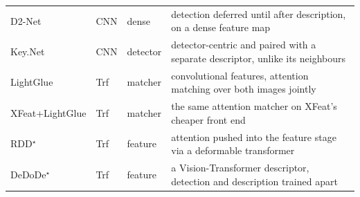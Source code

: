 \begin{table}[H]
\begin{tabular}{@{}llp{1.9cm}p{6.5cm}@{}}
D2-Net \cite{dusmanu2019d2net} & CNN & dense & detection deferred until after description, on a dense feature map \\
Key.Net \cite{barrosolaguna2019keynet} & CNN & detector & detector-centric and paired with a separate descriptor, unlike its neighbours \\
\addlinespace[2pt]
LightGlue \cite{lindenberger2023lightglue} & Trf & matcher & convolutional features, attention matching over both images jointly \\
XFeat+LightGlue \cite{lindenberger2023lightglue} & Trf & matcher & the same attention matcher on XFeat's cheaper front end \\
RDD$^\star$ \cite{chen2025rdd} & Trf & feature & attention pushed into the feature stage via a deformable transformer \\
DeDoDe$^\star$ \cite{edstedt2024dedode} & Trf & feature & a Vision-Transformer descriptor, detection and description trained apart \\
\bottomrule
\end{tabular}
\end{table}
